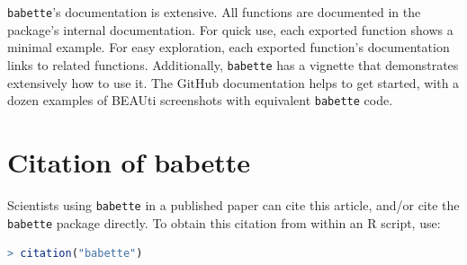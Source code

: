 \documentclass{article}
\begin{document}
\verb;babette;'s documentation is extensive. All functions are documented
in the package's internal documentation. For quick use, 
each exported function shows a minimal example. 
For easy exploration, each exported function's documentation links to related functions.
Additionally, \verb;babette; has a vignette that demonstrates extensively how
to use it. The GitHub documentation helps to get started, with a dozen examples 
of BEAUti screenshots with equivalent \verb;babette; code.

\section{Citation of babette}

Scientists using \verb;babette; in a published paper can cite this
article, and/or cite the \verb;babette; package 
directly. To obtain this citation from within an R script, use:

\begin{lstlisting}[language=R]
> citation("babette")
\end{lstlisting}




\begin{thebibliography}{}

\end{thebibliography}
\end{document}
